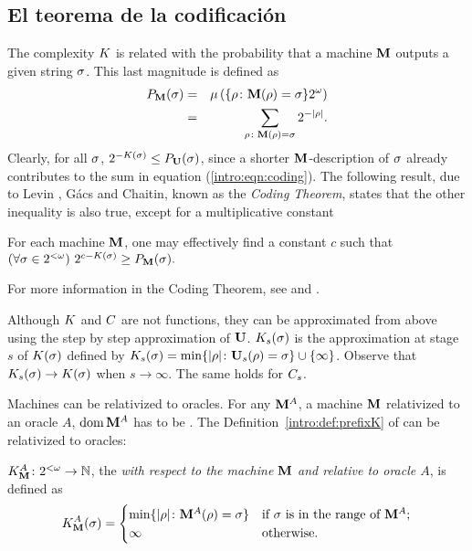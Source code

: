 \bigskip

\subsection{El teorema de la codificación}

The complexity $K$ is related with the probability that a \pfree
machine ${\bf M}$ outputs a given string $\sigma$. This last magnitude is
defined as 
\begin{eqnarray}
P_{{\bf M}}(\sigma)&=&\mu\left(\{\rho\colon{\bf M}(\rho)=\sigma\}2^{\omega}\right)\nonumber\\
&=&\sum_{\rho\colon{\bf M}(\rho)=\sigma}2^{-| \rho |}.\label{intro:eqn:coding}
\end{eqnarray}
Clearly, for all $\sigma$, $2^{-K(\sigma)}\leq P_{{\bf U}}(\sigma)$, since a
shorter ${\bf M}$-description of $\sigma$ already contributes to the sum
in equation (\ref{intro:eqn:coding}). The following result, due to
Levin \cite{levin1974laws}, G\'acs \cite{G74} and Chaitin, \cite{chaitin1975theory} known
as the {\em Coding Theorem}, states that the other inequality is
also true, except for a multiplicative constant

\begin{teorema}\label{intro:thm:coding} For each \pfree machine ${\bf M}$, one
may effectively find a constant $c$ such that $ (\forall
\sigma\in2^{<\omega})\ 2^{c-K(\sigma)}\geq P_{{\bf M}}(\sigma). $
\end{teorema}
For more information in the Coding Theorem, see \cite{LV97} and
\cite{DHBook}.

\bigskip

 Although $K$ and $C$ are not \comp functions,
they can be \recly approximated from above using the step by step
approximation of ${\bf U}$. $K_s(\sigma)$ is the
approximation at stage $s$ of $K(\sigma)$ defined by
$K_s(\sigma)=\min\{| \rho |\colon
{\bf U}_s(\rho)=\sigma\}\cup\{\infty\}$. Observe that
$K_s(\sigma)\to K(\sigma)$ when $s\to\infty$.
 The same holds for
${C_s}$.


Machines can be relativized to oracles. For any ${\bf M}^A$, a \pfree
machine ${\bf M}$ relativized to an oracle $A$, $\domain {\M^A}$ has to
be \pfree. The Definition~\ref{intro:def:prefixK} of \kolcomp can
be relativized to oracles:

\begin{definicion}\label{intro:def:prefixKwithOracle}
$K_{{\bf M}}^A\colon2^{<\omega} \to \mathbb{N}$, the {\em \pfree
\kolcomp with respect to the \pfree machine ${\bf M}$ and relative to
oracle $A$}, is defined as
$$
K_{{\bf M}}^A(\sigma)=
    \begin{cases}
    \min \{| \rho |\colon {\bf M}^A(\rho)=\sigma \} & \textrm{if $\sigma$ is in the range of ${\bf M}^A$};\\
    \infty & \textrm{otherwise.}
    \end{cases}
$$
\end{definicion}

